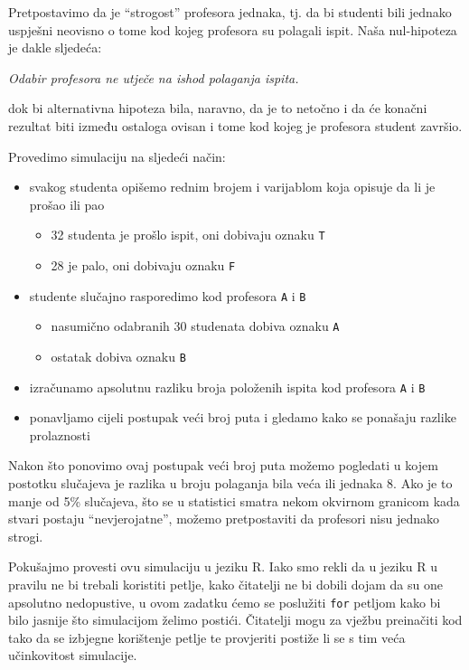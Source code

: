 \documentclass[]{book}
\providecommand{\tightlist}{%
  \setlength{\itemsep}{0pt}\setlength{\parskip}{0pt}}
\theoremstyle{definition}
\theoremstyle{definition}
\theoremstyle{definition}
\theoremstyle{remark}
\begin{document}
Pretpostavimo da je ``strogost'' profesora jednaka, tj. da bi studenti
bili jednako uspješni neovisno o tome kod kojeg profesora su polagali
ispit. Naša nul-hipoteza je dakle sljedeća:

\emph{Odabir profesora ne utječe na ishod polaganja ispita.}

dok bi alternativna hipoteza bila, naravno, da je to netočno i da će
konačni rezultat biti između ostaloga ovisan i tome kod kojeg je
profesora student završio.

Provedimo simulaciju na sljedeći način:

\begin{itemize}
\tightlist
\item
  svakog studenta opišemo rednim brojem i varijablom koja opisuje da li
  je prošao ili pao

  \begin{itemize}
  \tightlist
  \item
    32 studenta je prošlo ispit, oni dobivaju oznaku \texttt{T}
  \item
    28 je palo, oni dobivaju oznaku \texttt{F}
  \end{itemize}
\item
  studente slučajno rasporedimo kod profesora \texttt{A} i \texttt{B}

  \begin{itemize}
  \tightlist
  \item
    nasumično odabranih 30 studenata dobiva oznaku \texttt{A}
  \item
    ostatak dobiva oznaku \texttt{B}
  \end{itemize}
\item
  izračunamo apsolutnu razliku broja položenih ispita kod profesora
  \texttt{A} i \texttt{B}
\item
  ponavljamo cijeli postupak veći broj puta i gledamo kako se ponašaju
  razlike prolaznosti
\end{itemize}

Nakon što ponovimo ovaj postupak veći broj puta možemo pogledati u kojem
postotku slučajeva je razlika u broju polaganja bila veća ili jednaka 8.
Ako je to manje od 5\% slučajeva, što se u statistici smatra nekom
okvirnom granicom kada stvari postaju ``nevjerojatne'', možemo
pretpostaviti da profesori nisu jednako strogi.

Pokušajmo provesti ovu simulaciju u jeziku R. Iako smo rekli da u jeziku
R u pravilu ne bi trebali koristiti petlje, kako čitatelji ne bi dobili
dojam da su one apsolutno nedopustive, u ovom zadatku ćemo se poslužiti
\texttt{for} petljom kako bi bilo jasnije što simulacijom želimo
postići. Čitatelji mogu za vježbu preinačiti kod tako da se izbjegne
korištenje petlje te provjeriti postiže li se s tim veća učinkovitost
simulacije.
\end{document}
